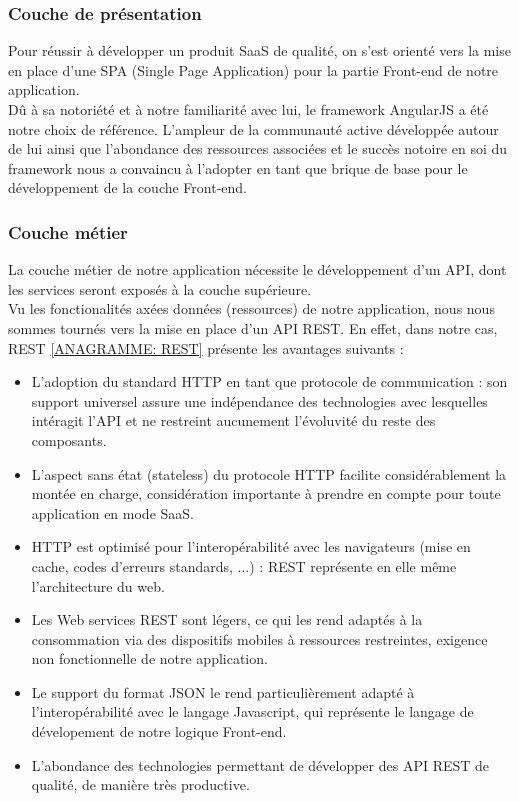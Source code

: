 \begin{spacing}{1.5}
\subsubsection*{Couche de présentation}%
Pour réussir à développer un produit SaaS de qualité, on s'est orienté vers la mise en place d'une SPA (Single Page Application) pour la partie Front-end de notre application.\\
Dû à sa notoriété et à notre familiarité avec lui, le framework AngularJS a été notre choix de référence. L'ampleur de la communauté active développée autour de lui ainsi que l'abondance des ressources associées et le succès notoire en soi du framework nous a convaincu à l'adopter en tant que brique de base pour le développement de la couche Front-end.

\subsubsection*{Couche métier}%
La couche métier de notre application nécessite le développement d'un API, dont les services seront exposés à la couche supérieure.\\
Vu les fonctionalités axées données (ressources) de notre application, nous nous sommes tournés vers la mise en place d'un API REST. En effet, dans notre cas, REST \ref{ANAGRAMME: REST} présente les avantages suivants :
\begin{itemize}
    \item L'adoption du standard HTTP en tant que protocole de communication : son support universel assure une indépendance des technologies avec lesquelles intéragit l'API et ne restreint aucunement l'évoluvité du reste des composants.
    \item L'aspect sans état (stateless) du protocole HTTP facilite considérablement la montée en charge, considération importante à prendre en compte pour toute application en mode SaaS.
    \item HTTP est optimisé pour l'interopérabilité avec les navigateurs (mise en cache, codes d'erreurs standards, ...) : REST représente en elle même l'architecture du web.
    \item Les Web services REST sont légers, ce qui les rend adaptés à la consommation via des dispositifs mobiles à ressources restreintes, exigence non fonctionnelle de notre application.
    \item Le support du format JSON le rend particulièrement adapté à l'interopérabilité avec le langage Javascript, qui représente le langage de dévelopement de notre logique Front-end.
    \item L'abondance des technologies permettant de développer des API REST de qualité, de manière très productive.
\end{itemize}
\


\end{spacing}
